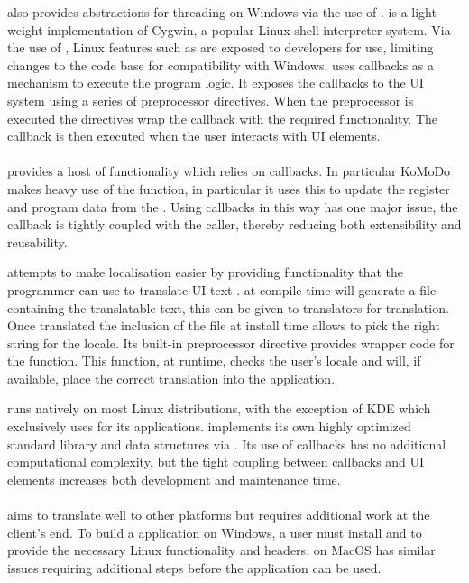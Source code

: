    also provides abstractions for threading on Windows via the use of \cite{msys}.  is a light-weight implementation of Cygwin, a popular Linux shell interpreter system. Via the use of , Linux features such as  are exposed to developers for use, limiting changes to the code base for compatibility with Windows.
   uses callbacks as a mechanism to execute the program logic. It exposes the callbacks to the  UI system using a series of preprocessor directives. When the preprocessor is executed the directives wrap the callback with the required functionality. The callback is then executed when the user interacts with UI elements.\\\\
   provides a host of functionality which relies on callbacks. In particular KoMoDo makes heavy use of the  function, in particular it uses this to update the register and program data from the . Using callbacks in this way has one major issue, the callback is tightly coupled with the caller, thereby reducing both extensibility and reusability.

   attempts to make localisation easier by providing functionality that the programmer can use to translate UI text \cite{gtk_localisation}.  at compile time will generate a file containing the translatable text, this can be given to translators for translation. Once translated the inclusion of the file at install time allows  to pick the right string for the locale. Its built-in preprocessor directive provides wrapper code for the  function. This function, at runtime, checks the user's locale and will, if available, place the correct translation into the application.

   runs natively on most Linux distributions, with the exception of KDE which exclusively uses  for its applications.  implements its own highly optimized standard library and data structures via \cite{glib}. Its use of callbacks has no additional computational complexity, but the tight coupling between callbacks and UI elements increases both development and maintenance time.\\\\
   aims to translate well to other platforms but requires additional work at the client's end. To build a  application on Windows, a user must install  and  to provide the necessary Linux functionality and headers.  on MacOS has similar issues requiring additional steps before the application can be used.

